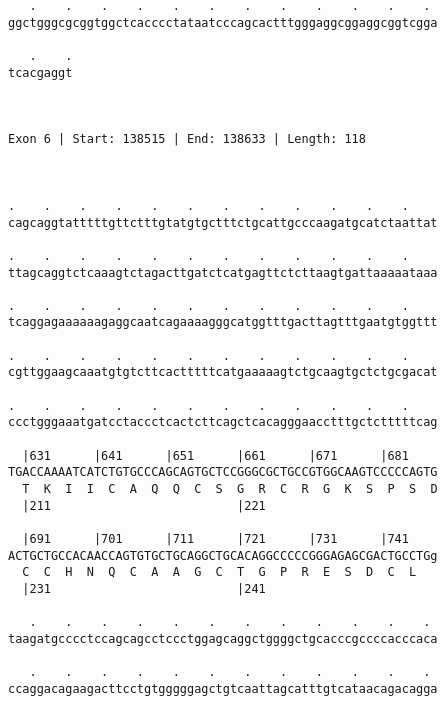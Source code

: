 \documentclass{article}
\begin{document}
\begin{Verbatim}
   .    .    .    .    .    .    .    .    .    .    .    . 
ggctgggcgcggtggctcacccctataatcccagcactttgggaggcggaggcggtcgga
                                                            
   .    .
tcacgaggt
         
         
 
Exon 6 | Start: 138515 | End: 138633 | Length: 118



.    .    .    .    .    .    .    .    .    .    .    .    
cagcaggtatttttgttctttgtatgtgctttctgcattgcccaagatgcatctaattat
                                                            
.    .    .    .    .    .    .    .    .    .    .    .    
ttagcaggtctcaaagtctagacttgatctcatgagttctcttaagtgattaaaaataaa
                                                            
.    .    .    .    .    .    .    .    .    .    .    .    
tcaggagaaaaaagaggcaatcagaaaagggcatggtttgacttagtttgaatgtggttt
                                                            
.    .    .    .    .    .    .    .    .    .    .    .    
cgttggaagcaaatgtgtcttcactttttcatgaaaaagtctgcaagtgctctgcgacat
                                                            
.    .    .    .    .    .    .    .    .    .    .    .    
ccctgggaaatgatcctaccctcactcttcagctcacagggaacctttgctctttttcag
                                                            
  |631      |641      |651      |661      |671      |681    
TGACCAAAATCATCTGTGCCCAGCAGTGCTCCGGGCGCTGCCGTGGCAAGTCCCCCAGTG
  T  K  I  I  C  A  Q  Q  C  S  G  R  C  R  G  K  S  P  S  D
  |211                          |221                        
  
  |691      |701      |711      |721      |731      |741    
ACTGCTGCCACAACCAGTGTGCTGCAGGCTGCACAGGCCCCCGGGAGAGCGACTGCCTGg
  C  C  H  N  Q  C  A  A  G  C  T  G  P  R  E  S  D  C  L   
  |231                          |241                        
  
   .    .    .    .    .    .    .    .    .    .    .    . 
taagatgcccctccagcagcctccctggagcaggctggggctgcacccgccccacccaca
                                                            
   .    .    .    .    .    .    .    .    .    .    .    . 
ccaggacagaagacttcctgtgggggagctgtcaattagcatttgtcataacagacagga
                                                            

\end{Verbatim}
\end{document}
